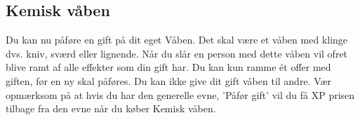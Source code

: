 \subsection*{Kemisk våben}
Du kan nu påføre en gift på dit eget Våben. Det skal være et våben med klinge dvs. kniv, sværd eller lignende. Når du slår en person med dette våben vil ofret blive ramt af alle effekter som din gift har. Du kan kun ramme ét offer med giften, før en ny skal påføres. Du kan ikke give dit gift våben til andre. Vær opmærksom på at hvis du har den generelle evne, 'Påfør gift' vil du få XP prisen tilbage fra den evne når du køber Kemisk våben.\\